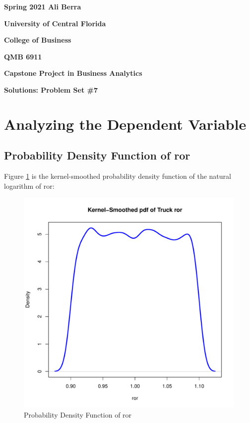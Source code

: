 \documentclass[11pt]{paper}
\begin{document}

\pagestyle{empty}
{\noindent\bf Spring 2021 \hfill Ali Berra}
\vskip 16pt
\centerline{\bf University of Central Florida}
\centerline{\bf College of Business}
\vskip 16pt
\centerline{\bf QMB 6911}
\centerline{\bf Capstone Project in Business Analytics}
\vskip 10pt
\centerline{\bf Solutions:  Problem Set \#7}
\vskip 32pt
\noindent


\section{Analyzing the Dependent Variable}

\subsection{Probability Density Function of ror}

Figure \ref{fig:density_ror} is the kernel-smoothed probability density function of the natural logarithm of
ror:

\begin{figure}[h!]
  \centering
  \includegraphics[scale = 0.5, keepaspectratio=true]{../Figures/density_ror}
  \caption{Probability Density Function of ror} \label{fig:density_ror}
\end{figure}
\end{document}
